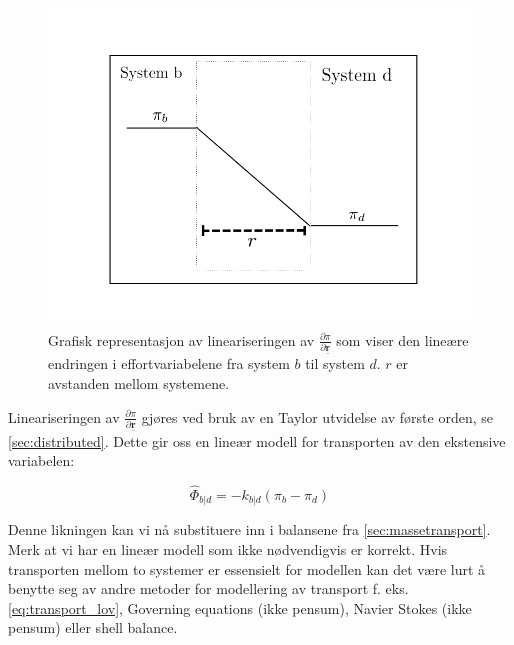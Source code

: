 \begin{figure}[H]
    \centering
    \includegraphics[scale=0.5]{Figures/linearized_transport.png}
    \caption{Grafisk representasjon av lineariseringen av $\frac{\partial \pi}{\partial \underline{\textbf{r}}}$  som viser den lineære endringen i effortvariabelene fra system $b$ til system $d$. $r$ er avstanden mellom systemene. }
    \label{fig:linearized_transport}
\end{figure}
Lineariseringen av $\frac{\partial \pi}{\partial \underline{\textbf{r}}}$ gjøres ved bruk av en Taylor utvidelse av første orden, se \cref{sec:distributed}. Dette gir oss en lineær modell for transporten av den ekstensive variabelen:



\begin{equation}
    \label{eq:transportlov_linear}
    \hat{\Phi}_{b|d} = -k_{b|d}(\pi_b-\pi_d)
\end{equation}

Denne likningen kan vi nå substituere inn i balansene fra  \cref{sec:massetransport}. Merk at vi har en lineær modell som ikke nødvendigvis er korrekt. Hvis transporten mellom to systemer er essensielt for modellen kan det være lurt å benytte seg av andre metoder for modellering av transport f. eks. \cref{eq:transport_lov}, Governing equations (ikke pensum), Navier Stokes (ikke pensum) eller shell balance. 

